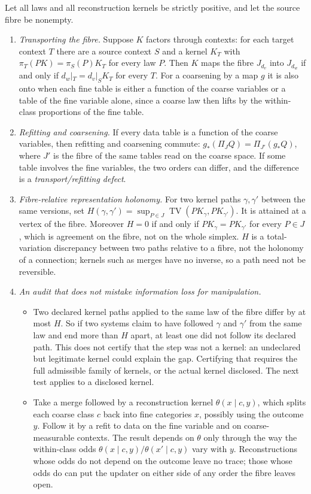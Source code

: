 \documentclass[11pt]{article}
\theoremstyle{definition}\newtheorem{definition}[theorem]{Definition}\newtheorem{remark}[theorem]{Remark}\newtheorem{example}[theorem]{Example}\newtheorem{problem}[theorem]{Open problem}\crefname{problem}{Problem}{Problems}
\begin{document}
\begin{proposition}\label{prop:kerneltransport}
Let all laws and all reconstruction kernels be strictly positive, and let the source fibre be nonempty.
\begin{enumerate}
\item[(i)] \emph{Transporting the fibre.} Suppose $K$ factors through contexts: for each target context $T$ there are a source context $S$ and a kernel $K_T$ with $\pi_T(PK)=\pi_S(P)K_T$ for every law $P$. Then $K$ maps the fibre $J_{d_v}$ into $J_{d_w}$ if and only if $d_w|_T=d_v|_SK_T$ for every $T$. For a coarsening by a map $g$ it is also onto when each fine table is either a function of the coarse variables or a table of the fine variable alone, since a coarse law then lifts by the within-class proportions of the fine table.
\item[(ii)] \emph{Refitting and coarsening.} If every data table is a function of the coarse variables, then refitting and coarsening commute: $g_*(\Pi_JQ)=\Pi_{J'}(g_*Q)$, where $J'$ is the fibre of the same tables read on the coarse space. If some table involves the fine variables, the two orders can differ, and the difference is a \emph{transport/refitting defect}.
\item[(iii)] \emph{Fibre-relative representation holonomy.} For two kernel paths $\gamma,\gamma'$ between the same versions, set $H(\gamma,\gamma')=\sup_{P\in J}\operatorname{TV}(PK_\gamma,PK_{\gamma'})$. It is attained at a vertex of the fibre. Moreover $H=0$ if and only if $PK_\gamma=PK_{\gamma'}$ for every $P\in J$, which is agreement on the fibre, not on the whole simplex. $H$ is a total-variation discrepancy between two paths relative to a fibre, not the holonomy of a connection; kernels such as merges have no inverse, so a path need not be reversible.
\item[(iv)] \emph{An audit that does not mistake information loss for manipulation.}
\begin{itemize}
\item Two declared kernel paths applied to the same law of the fibre differ by at most $H$. So if two systems claim to have followed $\gamma$ and $\gamma'$ from the same law and end more than $H$ apart, at least one did not follow its declared path. This does not certify that the step was not a kernel: an undeclared but legitimate kernel could explain the gap. Certifying that requires the full admissible family of kernels, or the actual kernel disclosed. The next test applies to a disclosed kernel.
\item Take a merge followed by a reconstruction kernel $\theta(x\mid c,y)$, which splits each coarse class $c$ back into fine categories $x$, possibly using the outcome $y$. Follow it by a refit to data on the fine variable and on coarse-measurable contexts. The result depends on $\theta$ only through the way the within-class odds $\theta(x\mid c,y)/\theta(x'\mid c,y)$ vary with $y$. Reconstructions whose odds do not depend on the outcome leave no trace; those whose odds do can put the updater on either side of any order the fibre leaves open.

\end{itemize}
\end{enumerate}
\end{proposition}
\end{document}
